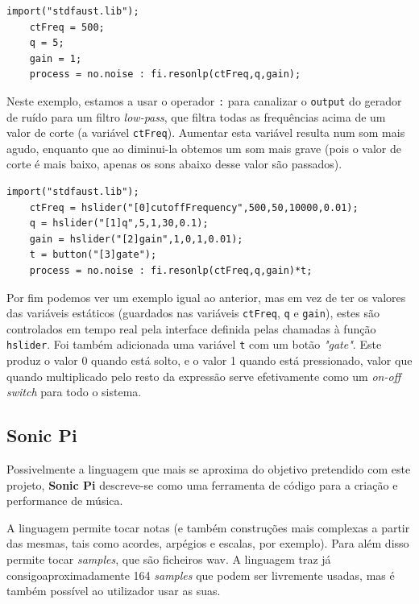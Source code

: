 \documentclass[
  oneside,
  11pt, a4paper,
  footinclude=true,
  headinclude=true,
  cleardoublepage=empty
]{scrbook}
\begin{document}
    \begin{lstlisting}[caption={Geração de ruído aleatório com um filtro \textit{low-pass}}]
    import("stdfaust.lib");
    ctFreq = 500;
    q = 5;
    gain = 1;
    process = no.noise : fi.resonlp(ctFreq,q,gain);
    \end{lstlisting}
    Neste exemplo, estamos a usar o operador \texttt{:} para canalizar o \texttt{output} do gerador de ruído para um filtro \textit{low-pass}, que filtra todas as frequências acima de um valor de corte (a variável \texttt{ctFreq}). Aumentar esta variável resulta num som mais agudo, enquanto que ao diminui-la obtemos um som mais grave (pois o valor de corte é mais baixo, apenas os sons abaixo desse valor são passados).
    
    \begin{lstlisting}[caption={Geração de ruído aleatório com um filtro \textit{low-pass} controlada por uma interface}]
    import("stdfaust.lib");
    ctFreq = hslider("[0]cutoffFrequency",500,50,10000,0.01);
    q = hslider("[1]q",5,1,30,0.1);
    gain = hslider("[2]gain",1,0,1,0.01);
    t = button("[3]gate");
    process = no.noise : fi.resonlp(ctFreq,q,gain)*t;
    \end{lstlisting}
    Por fim podemos ver um exemplo igual ao anterior, mas em vez de ter os valores das variáveis estáticos (guardados nas variáveis \texttt{ctFreq}, \texttt{q} e \texttt{gain}), estes são controlados em tempo real pela interface definida pelas chamadas à função \texttt{hslider}. Foi também adicionada uma variável \texttt{t} com um botão \textit{"gate"}. Este produz o valor 0 quando está solto, e o valor 1 quando está pressionado, valor que quando multiplicado pelo resto da expressão serve efetivamente como um \textit{on-off switch} para todo o sistema.
    
	\subsection{Sonic Pi}
	Possivelmente a linguagem que mais se aproxima do objetivo pretendido com este projeto, \textbf{Sonic Pi}\cite{sonic-pi} descreve-se como uma ferramenta de código para a criação e performance de música.
	
	A linguagem permite tocar notas (e também construções mais complexas a partir das mesmas, tais como acordes, arpégios e escalas, por exemplo). Para além disso permite tocar \textit{samples}, que são ficheiros \acrfull{wav}. A linguagem traz já consigoaproximadamente 164 \textit{samples} que podem ser livremente usadas, mas é também possível ao utilizador usar as suas.
	
\end{document}

